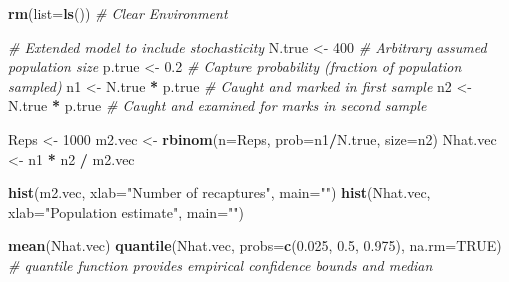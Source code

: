 \documentclass[
]{krantz}
\makeatletter
\newenvironment{Shaded}{\begin{snugshade}}{\end{snugshade}}
\newcommand{\AttributeTok}[1]{\textcolor[rgb]{0.27,0.27,0.27}{#1}}
\newcommand{\CommentTok}[1]{\textcolor[rgb]{0.37,0.37,0.37}{\textit{#1}}}
\newcommand{\ConstantTok}[1]{\textcolor[rgb]{0.37,0.37,0.37}{#1}}
\newcommand{\DecValTok}[1]{\textcolor[rgb]{0.06,0.06,0.06}{#1}}
\newcommand{\FloatTok}[1]{\textcolor[rgb]{0.06,0.06,0.06}{#1}}
\newcommand{\FunctionTok}[1]{\textcolor[rgb]{0.27,0.27,0.27}{\textbf{#1}}}
\newcommand{\NormalTok}[1]{#1}
\newcommand{\OtherTok}[1]{\textcolor[rgb]{0.37,0.37,0.37}{#1}}
\newcommand{\SpecialCharTok}[1]{\textcolor[rgb]{0.43,0.43,0.43}{\textbf{#1}}}
\newcommand{\StringTok}[1]{\textcolor[rgb]{0.5,0.5,0.5}{#1}}
\newenvironment{kframe}{%
\medskip{}
\setlength{\fboxsep}{.8em}
 \def\at@end@of@kframe{}%
 \ifinner\ifhmode%
  \def\at@end@of@kframe{\end{minipage}}%
  \begin{minipage}{\columnwidth}%
 \fi\fi%
 \def\FrameCommand##1{\hskip\@totalleftmargin \hskip-\fboxsep
 \colorbox{shadecolor}{##1}\hskip-\fboxsep
     \hskip-\linewidth \hskip-\@totalleftmargin \hskip\columnwidth}%
 \MakeFramed {\advance\hsize-\width
   \@totalleftmargin\z@ \linewidth\hsize
   \@setminipage}}%
 {\par\unskip\endMakeFramed%
 \at@end@of@kframe}
\renewenvironment{Shaded}{\begin{kframe}}{\end{kframe}}
\makeatother
\begin{document}
\begin{Shaded}
\begin{Highlighting}[]
\FunctionTok{rm}\NormalTok{(}\AttributeTok{list=}\FunctionTok{ls}\NormalTok{()) }\CommentTok{\# Clear Environment}

\CommentTok{\# Extended model to include stochasticity }
\NormalTok{N.true }\OtherTok{\textless{}{-}} \DecValTok{400}  \CommentTok{\# Arbitrary assumed population size}
\NormalTok{p.true }\OtherTok{\textless{}{-}} \FloatTok{0.2} \CommentTok{\# Capture probability (fraction of population sampled)}
\NormalTok{n1 }\OtherTok{\textless{}{-}}\NormalTok{ N.true }\SpecialCharTok{*}\NormalTok{ p.true }\CommentTok{\# Caught and marked in first sample}
\NormalTok{n2 }\OtherTok{\textless{}{-}}\NormalTok{ N.true }\SpecialCharTok{*}\NormalTok{ p.true }\CommentTok{\# Caught and examined for marks in second sample}

\NormalTok{Reps }\OtherTok{\textless{}{-}} \DecValTok{1000}
\NormalTok{m2.vec }\OtherTok{\textless{}{-}} \FunctionTok{rbinom}\NormalTok{(}\AttributeTok{n=}\NormalTok{Reps, }\AttributeTok{prob=}\NormalTok{n1}\SpecialCharTok{/}\NormalTok{N.true, }\AttributeTok{size=}\NormalTok{n2)}
\NormalTok{Nhat.vec }\OtherTok{\textless{}{-}}\NormalTok{ n1 }\SpecialCharTok{*}\NormalTok{ n2 }\SpecialCharTok{/}\NormalTok{ m2.vec}

\FunctionTok{hist}\NormalTok{(m2.vec, }\AttributeTok{xlab=}\StringTok{"Number of recaptures"}\NormalTok{, }\AttributeTok{main=}\StringTok{""}\NormalTok{)}
\FunctionTok{hist}\NormalTok{(Nhat.vec, }\AttributeTok{xlab=}\StringTok{"Population estimate"}\NormalTok{, }\AttributeTok{main=}\StringTok{""}\NormalTok{)}

\FunctionTok{mean}\NormalTok{(Nhat.vec)}
\FunctionTok{quantile}\NormalTok{(Nhat.vec, }\AttributeTok{probs=}\FunctionTok{c}\NormalTok{(}\FloatTok{0.025}\NormalTok{, }\FloatTok{0.5}\NormalTok{, }\FloatTok{0.975}\NormalTok{), }\AttributeTok{na.rm=}\ConstantTok{TRUE}\NormalTok{)}
\CommentTok{\# quantile function provides empirical confidence bounds and median}
\end{Highlighting}
\end{Shaded}
\end{document}
